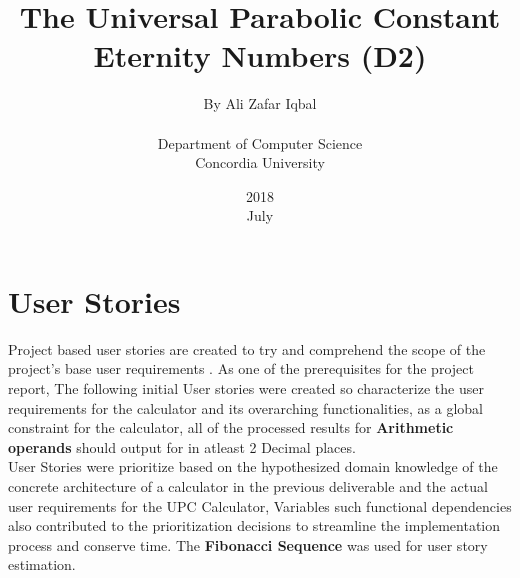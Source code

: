 \documentclass[12pt]{report}
\title{The Universal Parabolic Constant\\ \textbf{Eternity Numbers (D2)}}
\date{2018\\ July}
\author{By Ali Zafar Iqbal\\\\ Department of Computer Science \\Concordia University }
\date{}
\begin{document}
 
\maketitle 


\baselineskip20pt


\tableofcontents




\newpage




 


\chapter{User Stories}
    
   Project based user stories are created to try and comprehend the scope of the project's  base user requirements .  As one of the prerequisites for the project report,  The following initial User stories were created so characterize the user requirements for the calculator and its overarching functionalities, as a global constraint for the calculator, all of the processed results for \textbf{Arithmetic operands} should output for in atleast 2 Decimal places.
   \hfill \break\\
   
   \noindent User Stories were prioritize based on the hypothesized domain knowledge of the concrete architecture of a calculator in the previous deliverable  and the actual user requirements for the UPC Calculator, Variables such functional dependencies also contributed to the prioritization decisions to streamline the implementation process and conserve time. The \textbf{Fibonacci Sequence} was used for user story estimation.
\end{document}
